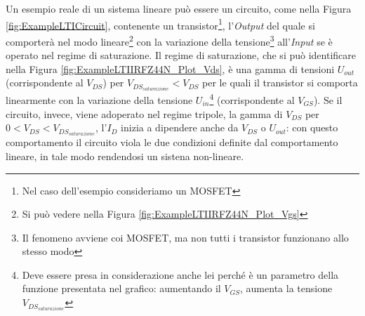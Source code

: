 \documentclass[a4paper, 10pt, final]{article} %
\begin{document}
    Un esempio reale di un sistema lineare pu\`{o} essere un circuito, come nella Figura \ref{fig:ExampleLTICircuit}, contenente un transistor\footnote{Nel caso dell'esempio consideriamo un MOSFET}, l'\emph{Output} del quale si comporter\`{a} nel modo lineare\footnote{Si pu\`{o} vedere nella Figura \ref{fig:ExampleLTIIRFZ44N_Plot_Vgs}} con la variazione della tensione\footnote{Il fenomeno avviene coi MOSFET, ma non tutti i transistor funzionano allo stesso modo} all'\emph{Input} se \`{e} operato nel regime di saturazione.
    Il regime di saturazione, che si pu\`{o} identificare nella Figura \ref{fig:ExampleLTIIRFZ44N_Plot_Vds}, \`{e} una gamma di tensioni $U_{out}$ (corrispondente al $V_{DS}$) per $V_{DS_{saturazione}} < V_{DS}$ per le quali il transistor si comporta linearmente con la variazione della tensione $U_{in}$\footnote{Deve essere presa in considerazione anche lei perch\'{e} \`{e} un parametro della funzione presentata nel grafico: aumentando il $V_{GS}$, aumenta la tensione $V_{DS_{saturazione}}$} (corrispondente al $V_{GS}$).
    Se il circuito, invece, viene adoperato nel regime tripole, la gamma di $V_{DS}$ per $0 < V_{DS} < V_{DS_{saturazione}}$, l'$I_D$ inizia a dipendere anche da $V_{DS}$ o $U_{out}$: con questo comportamento il circuito viola le due condizioni definite dal comportamento lineare, in tale modo rendendosi un sistena non-lineare.
\end{document}
